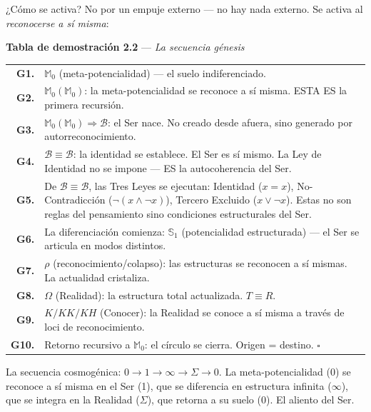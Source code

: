 \documentclass[10pt, openany, oneside]{book}
\begin{document}
¿Cómo se activa? No por un empuje externo --- no hay nada externo. Se activa al \textit{reconocerse a sí misma}:

\vspace{0.5em}

\textbf{Tabla de demostración 2.2} --- \textit{La secuencia génesis}

\vspace{0.5em}

\noindent\begin{tabular}{r p{}}
\textbf{G1.} & $\mathbb{M}_0$ (meta-potencialidad) --- el suelo indiferenciado. \\[0.3em]
\textbf{G2.} & $\mathbb{M}_0(\mathbb{M}_0)$: la meta-potencialidad se reconoce a sí misma. ESTA ES la primera recursión. \\[0.3em]
\textbf{G3.} & $\mathbb{M}_0(\mathbb{M}_0) \Rightarrow \mathcal{B}$: el Ser nace. No creado desde afuera, sino generado por autorreconocimiento. \\[0.3em]
\textbf{G4.} & $\mathcal{B} \equiv \mathcal{B}$: la identidad se establece. El Ser es sí mismo. La Ley de Identidad no se impone --- ES la autocoherencia del Ser. \\[0.3em]
\textbf{G5.} & De $\mathcal{B} \equiv \mathcal{B}$, las Tres Leyes se ejecutan: Identidad ($x = x$), No-Contradicción ($\neg(x \wedge \neg x)$), Tercero Excluido ($x \vee \neg x$). Estas no son reglas del pensamiento sino condiciones estructurales del Ser. \\[0.3em]
\textbf{G6.} & La diferenciación comienza: $\mathbb{S}_1$ (potencialidad estructurada) --- el Ser se articula en modos distintos. \\[0.3em]
\textbf{G7.} & $\rho$ (reconocimiento/colapso): las estructuras se reconocen a sí mismas. La actualidad cristaliza. \\[0.3em]
\textbf{G8.} & $\Omega$ (Realidad): la estructura total actualizada. $T \equiv R$. \\[0.3em]
\textbf{G9.} & $K/KK/KH$ (Conocer): la Realidad se conoce a sí misma a través de loci de reconocimiento. \\[0.3em]
\textbf{G10.} & Retorno recursivo a $\mathbb{M}_0$: el círculo se cierra. Origen = destino. $\square$ \\[0.3em]
\end{tabular}

\vspace{0.8em}

\noindent La secuencia cosmogénica: $0 \to 1 \to \infty \to \Sigma \to 0$. La meta-potencialidad (0) se reconoce a sí misma en el Ser (1), que se diferencia en estructura infinita ($\infty$), que se integra en la Realidad ($\Sigma$), que retorna a su suelo (0). El aliento del Ser.
\end{document}

